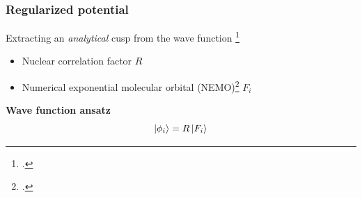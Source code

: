\begin{frame}
\frametitle{Regularized potential}
\scriptsize

Extracting an \emph{analytical} cusp from the wave function
\footcite{Bischoff_2014a}
\begin{itemize}
    \item Nuclear correlation factor $R$
    \item Numerical exponential molecular orbital (NEMO)\footcite{Seelig_1966} $F_i$
\end{itemize}

\vspace{5mm}

\centering
\textbf{Wave function ansatz}
\begin{equation}
    \nonumber
    \ket{\phi_i} = R\ket{F_i}
\end{equation}


\end{frame}
